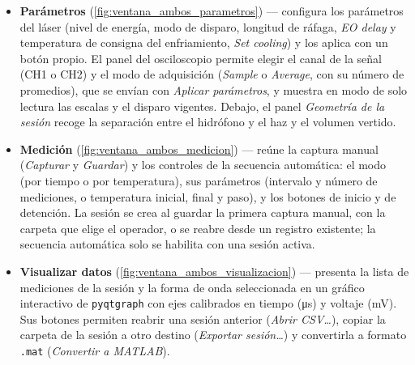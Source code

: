 \begin{itemize}
  \item \textbf{Parámetros} (\cref{fig:ventana_ambos_parametros}) —
    configura los parámetros del láser (nivel de energía, modo de
    disparo, longitud de ráfaga, \textit{EO delay} y temperatura de
    consigna del enfriamiento, \textit{Set cooling}) y los aplica con
    un botón propio. El panel del osciloscopio permite elegir el canal
    de la señal (CH1 o CH2) y el modo de adquisición
    (\textit{Sample} o \textit{Average}, con su número de promedios),
    que se envían con \textit{Aplicar parámetros}, y muestra en modo
    de solo lectura las escalas y el disparo vigentes. Debajo, el panel
    \textit{Geometría de la sesión} recoge la separación entre el
    hidrófono y el haz y el volumen vertido.

  \item \textbf{Medición} (\cref{fig:ventana_ambos_medicion}) — reúne
    la captura manual (\textit{Capturar} y \textit{Guardar}) y los
    controles de la secuencia automática: el modo (por tiempo o por
    temperatura), sus parámetros (intervalo y número de mediciones, o
    temperatura inicial, final y paso), y los botones de inicio y de
    detención. La sesión se crea al guardar la primera captura manual,
    con la carpeta que elige el operador, o se reabre desde un registro
    existente; la secuencia automática solo se habilita con una sesión
    activa.

  \item \textbf{Visualizar datos} (\cref{fig:ventana_ambos_visualizacion})
    — presenta la lista de mediciones de la sesión y la forma de onda
    seleccionada en un gráfico interactivo de \texttt{pyqtgraph} con
    ejes calibrados en tiempo (\si{\micro\second}) y voltaje
    (\si{\milli\volt}). Sus botones permiten reabrir una sesión
    anterior (\textit{Abrir CSV\ldots}), copiar la carpeta de la
    sesión a otro destino (\textit{Exportar sesión\ldots}) y
    convertirla a formato \texttt{.mat} (\textit{Convertir a MATLAB}).
\end{itemize}

